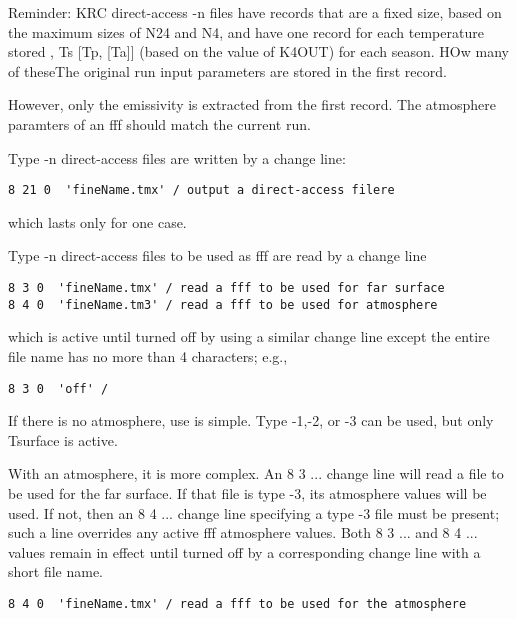 \documentclass{article}
\begin{document}
Reminder: KRC direct-access -n files have records that are a fixed size, based on
the maximum sizes of N24 and N4, and have one record for each temperature stored
, Ts [Tp, [Ta]] (based on the value of K4OUT) for each season. HOw many of theseThe original run input parameters are stored in the first record.

However, only the emissivity is extracted from the first record. The atmosphere paramters of an fff should match the current run.

Type -n direct-access files are written by a change line:
\vspace{-4.mm} 
\begin{verbatim}
8 21 0  'fineName.tmx' / output a direct-access filere
\end{verbatim}
\vspace{-4.mm} 
which lasts only for one case.

Type -n direct-access files to be used as fff are read by a change line
\vspace{-4.mm} 
\begin{verbatim}
8 3 0  'fineName.tmx' / read a fff to be used for far surface
8 4 0  'fineName.tm3' / read a fff to be used for atmosphere
\end{verbatim}
\vspace{-4.mm} 
which is active until turned off by using a similar change line except the entire file name has no more than 4 characters; e.g.,
\vspace{-4.mm} 
\begin{verbatim}
8 3 0  'off' / 
\end{verbatim}

If there is no atmosphere, use is simple. Type -1,-2, or -3 can be used, but only Tsurface is active.

With an atmosphere, it is more complex. An 8 3 ... change line will read a file
to be used for the far surface. If that file is type -3, its atmosphere values
will be used. If not, then an 8 4 ... change line specifying a type -3 file must
be present; such a line overrides any active fff atmosphere values.  Both 8 3 ... and 8 4 ... values remain in effect until turned off by
a corresponding change line with a short file name.
\vspace{-3.mm} 
\begin{verbatim}
8 4 0  'fineName.tmx' / read a fff to be used for the atmosphere
\end{verbatim}
\end{document}
